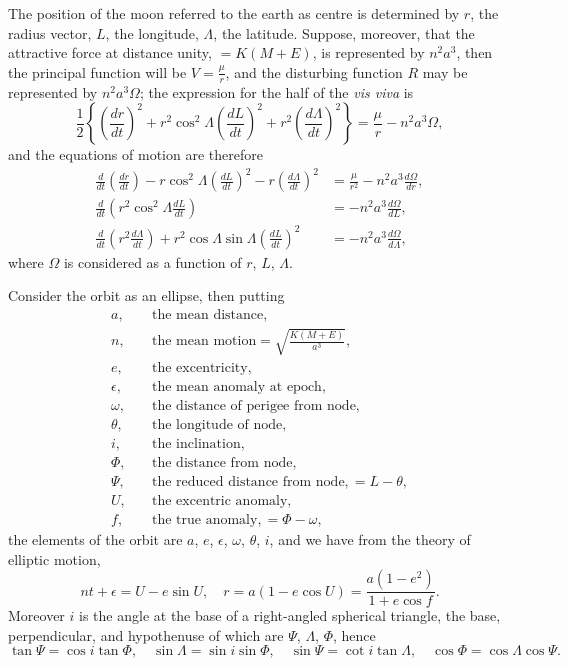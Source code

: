 \documentclass[12pt,a4paper]{article}
\theoremstyle{plain}
\begin{document}
The position of the moon referred to the earth as centre is determined by $r$, the radius vector, $L$, the longitude, $\Lambda$, the latitude. Suppose, moreover, that the attractive force at distance unity, $= K(M+E)$, is represented by $n^2a^3$, then the principal function will be $V = \frac{\mu}{r}$, and the disturbing function $R$ may be represented by $n^2a^3\Omega$; the expression for the half of the \textit{vis viva} is
\[
\frac{1}{2}\left\{\left(\frac{dr}{dt}\right)^2 + r^2\cos^2\Lambda\left(\frac{dL}{dt}\right)^2 + r^2\left(\frac{d\Lambda}{dt}\right)^2\right\} = \frac{\mu}{r} - n^2a^3\Omega,
\]
and the equations of motion are therefore
\begin{align*}
\frac{d}{dt}\left(\frac{dr}{dt}\right) - r\cos^2\Lambda\left(\frac{dL}{dt}\right)^2 - r\left(\frac{d\Lambda}{dt}\right)^2 &= \frac{\mu}{r^2} - n^2a^3\frac{d\Omega}{dr}, \\
\frac{d}{dt}\left(r^2\cos^2\Lambda\frac{dL}{dt}\right) &= -n^2a^3\frac{d\Omega}{dL}, \\
\frac{d}{dt}\left(r^2\frac{d\Lambda}{dt}\right) + r^2\cos\Lambda\sin\Lambda\left(\frac{dL}{dt}\right)^2 &= -n^2a^3\frac{d\Omega}{d\Lambda},
\end{align*}
where $\Omega$ is considered as a function of $r$, $L$, $\Lambda$.

Consider the orbit as an ellipse, then putting
\begin{align*}
a, \quad &\text{the mean distance}, \\
n, \quad &\text{the mean motion} = \sqrt{\frac{K(M+E)}{a^3}}, \\
e, \quad &\text{the excentricity}, \\
\epsilon, \quad &\text{the mean anomaly at epoch}, \\
\omega, \quad &\text{the distance of perigee from node}, \\
\theta, \quad &\text{the longitude of node}, \\
i, \quad &\text{the inclination}, \\
\Phi, \quad &\text{the distance from node}, \\
\Psi, \quad &\text{the reduced distance from node}, = L - \theta, \\
U, \quad &\text{the excentric anomaly}, \\
f, \quad &\text{the true anomaly}, = \Phi - \omega,
\end{align*}
the elements of the orbit are $a$, $e$, $\epsilon$, $\omega$, $\theta$, $i$, and we have from the theory of elliptic motion,
\[
nt + \epsilon = U - e\sin U, \quad r = a(1 - e\cos U) = \frac{a(1-e^2)}{1+e\cos f}.
\]
Moreover $i$ is the angle at the base of a right-angled spherical triangle, the base, perpendicular, and hypothenuse of which are $\Psi$, $\Lambda$, $\Phi$, hence
\[
\tan\Psi = \cos i\tan\Phi, \quad \sin\Lambda = \sin i\sin\Phi, \quad \sin\Psi = \cot i\tan\Lambda, \quad \cos\Phi = \cos\Lambda\cos\Psi.
\]
\end{document}
